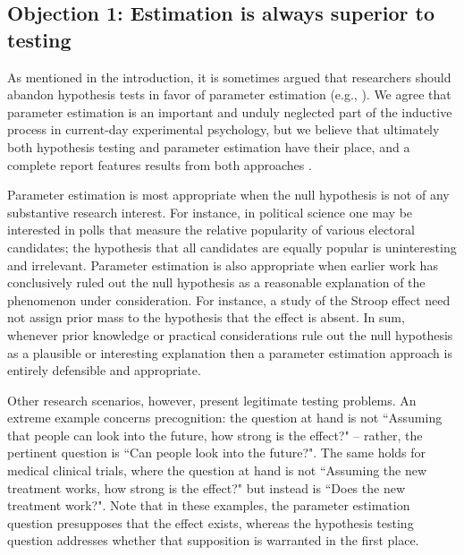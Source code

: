 \subsection{Objection 1: Estimation is always superior to testing}
As mentioned in the introduction, it is sometimes argued that researchers should abandon hypothesis tests in favor of parameter estimation (e.g., ). We agree that parameter estimation is an important and unduly neglected part of the inductive process in current-day experimental psychology, but we believe that ultimately both hypothesis testing and parameter estimation have their place, and a complete report features results from both approaches \cite{Berger2006}.

Parameter estimation is most appropriate when the null hypothesis is not of any substantive research interest. For instance, in political science one may be interested in polls that measure the relative popularity of various electoral candidates; the hypothesis that all candidates are equally popular is uninteresting and irrelevant. Parameter estimation is also appropriate when earlier work has conclusively ruled out the null hypothesis as a reasonable explanation of the phenomenon under consideration. For instance, a study of the Stroop effect need not assign prior mass to the hypothesis that the effect is absent. In sum, whenever prior knowledge or practical considerations rule out the null hypothesis as a plausible or interesting explanation then a parameter estimation approach is entirely defensible and appropriate.

Other research scenarios, however, present legitimate testing problems. An extreme example concerns precognition: the question at hand is not ``Assuming that people can look into the future, how strong is the effect?" -- rather, the pertinent question is ``Can people look into the future?". The same holds for medical clinical trials, where the question at hand is not ``Assuming the new treatment works, how strong is the effect?" but instead is ``Does the new treatment work?". Note that in these examples, the parameter estimation question presupposes that the effect exists, whereas the hypothesis testing question addresses whether that supposition is warranted in the first place.

